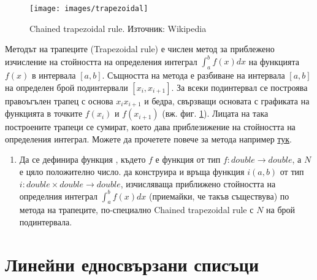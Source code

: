 \begin{figure}
  \begin{centering}
  \texttt{[image: images/trapezoidal]}
  \caption{Chained trapezoidal rule. Източник: Wikipedia\cite{trapezoidal}}
  \label{fig:trapezoidal}
  \end{centering}
\end{figure}
  

\begin{mdframed}[hidealllines=true,backgroundcolor=gray!20]
  Методът на трапеците\cite{trapezoidal} (Trapezoidal rule) е числен метод за приблежено изчисление на стойността на определения интеграл $\int_{a}^{b} f(x) dx$ на функцията $f(x)$ в интервала $[a,b]$. Същността на метода е разбиване на интервала $[a,b]$ на определен брой подинтервали $[x_i,x_{i+1}]$. За всеки подинтервал се построява правоъгълен трапец с основа $x_i x_{i+1}$ и бедра, свързващи основата с графиката на функцията в точките $f(x_i)$ и $f(x_{i+1})$ (вж. фиг. \ref{fig:trapezoidal}). Лицата на така построените трапеци се сумират, което дава приблезижение на стойността на определения интеграл. Можете да прочетете повече за метода например \href{https://en.wikipedia.org/wiki/Trapezoidal_rule}{тук}\cite{trapezoidal}.
\end{mdframed}  

\begin{enumerate}[resume]

  \item Да се дефинира функция , където $f$ е функция от тип $f:double \rightarrow double$, а $N$ е цяло положително число.  да конструира и връща функция $i(a,b)$ от тип $i:double \times double \rightarrow double$, изчисляваща приближено стойността на определния интеграл $\int_{a}^{b} f(x) dx$ (приемайки, че такъв съществува) по метода на трапеците, по-специално Chained trapezoidal rule\cite{trapezoidal} с $N$ на брой подинтервала.
\end{enumerate}

\pagebreak

\clearpage\section{\label{sect:llists}Линейни едносвързани списъци}

